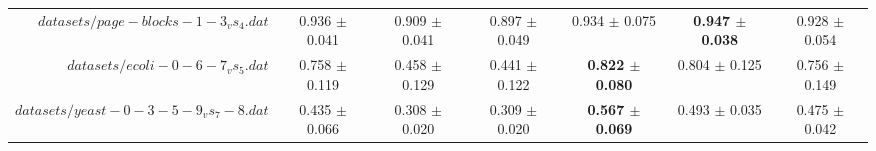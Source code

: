 \begin{table}[!ht]
{\begin{tabular}{r c c c c c c}
$datasets/page-blocks-1-3_vs_4.dat$ & 0.936 $\pm$ 0.041 & 0.909 $\pm$ 0.041 & 0.897 $\pm$ 0.049 & 0.934 $\pm$ 0.075 & \textbf{0.947 $\pm$ 0.038} & 0.928 $\pm$ 0.054 \\
$datasets/ecoli-0-6-7_vs_5.dat$ & 0.758 $\pm$ 0.119 & 0.458 $\pm$ 0.129 & 0.441 $\pm$ 0.122 & \textbf{0.822 $\pm$ 0.080} & 0.804 $\pm$ 0.125 & 0.756 $\pm$ 0.149 \\
$datasets/yeast-0-3-5-9_vs_7-8.dat$ & 0.435 $\pm$ 0.066 & 0.308 $\pm$ 0.020 & 0.309 $\pm$ 0.020 & \textbf{0.567 $\pm$ 0.069} & 0.493 $\pm$ 0.035 & 0.475 $\pm$ 0.042 \\
\end{tabular}}
\end{table}
